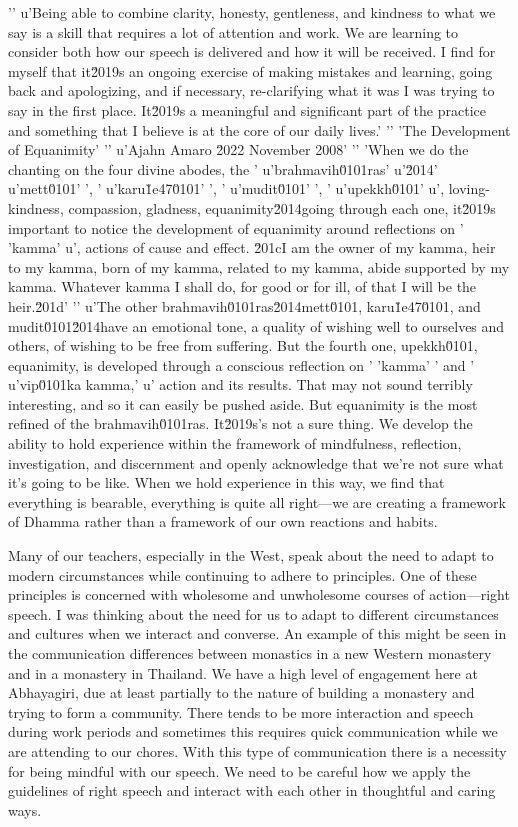 {'\n'
u'Being able to combine clarity, honesty, gentleness, and kindness to what we say is a skill that requires a lot of attention and work. We are learning to consider both how our speech is delivered and how it will be received. I find for myself that it\u2019s an ongoing exercise of making mistakes and learning, going back and apologizing, and if necessary, re-clarifying what it was I was trying to say in the first place. It\u2019s a meaningful and significant part of the practice and something that I believe is at the core of our daily lives.'
'\n'
'The Development of Equanimity'
'\n'
u'Ajahn Amaro \u2022 November 2008'
'\n'
'When we do the chanting on the four divine abodes, the '
u'brahmavih\u0101ras'
u'\u2014'
u'mett\u0101'
', '
u'karu\u1e47\u0101'
', '
u'mudit\u0101'
', '
u'upekkh\u0101'
u', loving-kindness, compassion, gladness, equanimity\u2014going through each one, it\u2019s important to notice the development of equanimity around reflections on '
'kamma'
u', actions of cause and effect. \u201cI am the owner of my kamma, heir to my kamma, born of my kamma, related to my kamma, abide supported by my kamma. Whatever kamma I shall do, for good or for ill, of that I will be the heir.\u201d'
'\n'
u'The other brahmavih\u0101ras\u2014mett\u0101, karu\u1e47\u0101, and mudit\u0101\u2014have an emotional tone, a quality of wishing well to ourselves and others, of wishing to be free from suffering. But the fourth one, upekkh\u0101, equanimity, is developed through a conscious reflection on '
'kamma'
' and '
u'vip\u0101ka kamma,'
u' action and its results. That may not sound terribly interesting, and so it can easily be pushed aside. But equanimity is the most refined of the brahmavih\u0101ras. It\u2019s's not a sure thing.} We develop the ability to hold experience 
within the framework of mindfulness, reflection, investigation, and 
discernment and openly acknowledge that we're not sure what it's going 
to be like. When we hold experience in this way, we find that 
everything is bearable, everything is quite all right---we are creating 
a framework of Dhamma rather than a framework of our own reactions and 
habits.


Many of our teachers, especially in the West, speak about the need to 
adapt to modern circumstances while continuing to adhere to principles. 
One of these principles is concerned with wholesome and unwholesome 
courses of action---right speech. I was thinking about the need for us 
to adapt to different circumstances and cultures when we interact and 
converse. An example of this might be seen in the communication 
differences between monastics in a new Western monastery and in a 
monastery in Thailand. We have a high level of engagement here at 
Abhayagiri, due at least partially to the nature of building a 
monastery and trying to form a community. There tends to be more 
interaction and speech during work periods and sometimes this requires 
quick communication while we are attending to our chores. With this 
type of communication there is a necessity for being mindful with our 
speech. We need to be careful how we apply the guidelines of right 
speech and interact with each other in thoughtful and caring ways.

